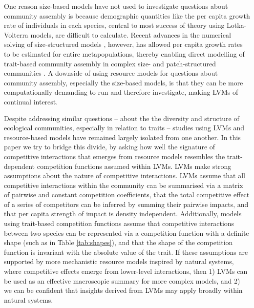 \documentclass[a4paper,11pt]{article}
\begin{document}
One reason size-based models have not used to investigate questions about community assembly is because demographic quantities like the per capita growth rate of individuals in each species, central to most success of theory using Lotka-Volterra models, are difficult to calculate. Recent advances in the numerical solving of size-structured models \citep{Falster-2016}, however, has allowed per capita growth rates to be estimated for entire metapopulations, thereby enabling direct modelling of trait-based community assembly in complex size- and patch-structured communities \cite{Falster-2017}. A downside of using resource models for questions about community assembly, especially the size-based models, is that they can be more computationally demanding to run and therefore investigate, making LVMs of continual interest.

Despite addressing similar questions -- about the the diversity and structure of ecological communities, especially in relation to traits -- studies using LVMs and resource-based models have remained largely isolated from one another. In this paper we try to bridge this divide, by asking how well the signature of competitive interactions that emerges from resource models resembles the trait-dependent competition functions assumed within LVMs. LVMs make strong assumptions about the nature of competitive interactions. LVMs assume that all competitive interactions within the community can be summarised via a matrix of pairwise and constant competition coefficients, that the total competitive effect of a series of competitors can be inferred by summing their pairwise impacts, and that per capita strength of impact is density independent. Additionally, models using trait-based competition functions assume that competitive interactions between two species can be represented via a competition function with a definite shape (such as in Table \ref{tab:shapes}), and that the shape of the competition function is invariant with the absolute value of the trait. If these assumptions are supported by more mechanistic resource models inspired by natural systems, where competitive effects emerge from lower-level interactions, then 1) LVMs can be used as an effective macroscopic summary for more complex models, and 2) we can be confident that insights derived from LVMs may apply broadly within natural systems.
\end{document}
